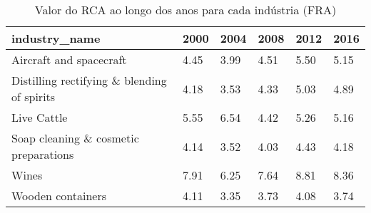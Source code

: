 \begin{table}
\centering
\caption{Valor do RCA ao longo dos anos para cada indústria (FRA)}
\begin{tabular}{p{6cm}p{1.5cm}p{1.5cm}p{1.5cm}p{1.5cm}p{1.5cm}}
\toprule
                              industry\_name & 2000 & 2004 & 2008 & 2012 & 2016 \\
\midrule
                    Aircraft and spacecraft & 4.45 & 3.99 & 4.51 & 5.50 & 5.15 \\
Distilling rectifying \& blending of spirits & 4.18 & 3.53 & 4.33 & 5.03 & 4.89 \\
                                Live Cattle & 5.55 & 6.54 & 4.42 & 5.26 & 5.16 \\
      Soap cleaning \& cosmetic preparations & 4.14 & 3.52 & 4.03 & 4.43 & 4.18 \\
                                      Wines & 7.91 & 6.25 & 7.64 & 8.81 & 8.36 \\
                          Wooden containers & 4.11 & 3.35 & 3.73 & 4.08 & 3.74 \\
\bottomrule
\end{tabular}
\end{table}
